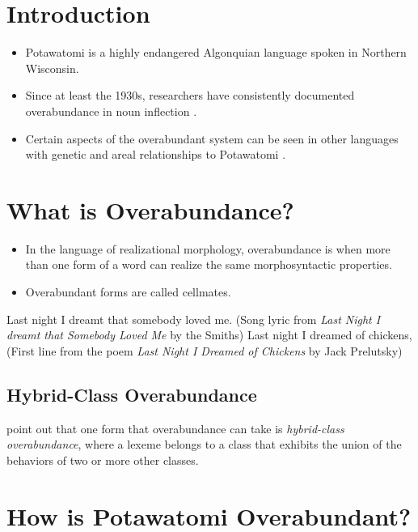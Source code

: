
\section{Introduction}

\begin{itemize}
\item Potawatomi is a highly endangered Algonquian language spoken in
  Northern Wisconsin.
\item Since at least the 1930s, researchers have consistently
  documented overabundance in noun inflection
  \citep{hockett1948potawatomi2, potdict, lockwood2017potawatomi}.
\item Certain aspects of the overabundant system can be seen in other
  languages with genetic and areal relationships to Potawatomi
  \citep{odawagrammar, ahenakew1987cree}.
\end{itemize}

\section{What is Overabundance?}

\begin{itemize}
\item In the language of realizational morphology, overabundance
  \citep{hockett1947problems, thornton2011overabundance,
    thornton2012reduction} is when more than one form of a word can
  realize the same morphosyntactic properties.
\item Overabundant forms are called cellmates.
\end{itemize}

\pex
\a Last night I dreamt that somebody loved me. (Song lyric from {\it Last Night I dreamt that Somebody Loved Me} by the Smiths)
\a Last night I dreamed of chickens, (First line from the poem {\it Last Night I Dreamed of Chickens} by Jack Prelutsky)
\xe

\subsection{Hybrid-Class Overabundance}

\citet{naranjo2016overabundance} point out that one form that
overabundance \citep{hockett1947problems, thornton2011overabundance}
can take is \emph{hybrid-class overabundance}, where a lexeme belongs
to a class that exhibits the union of the behaviors of two or more
other classes.
        
\section{How is Potawatomi Overabundant?}

